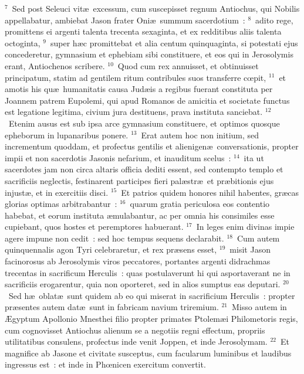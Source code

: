 ${}^{7}$~Sed post Seleuci vit\ae\ excessum, cum suscepisset regnum Antiochus, qui Nobilis appellabatur, ambiebat Jason frater Oni\ae\ summum sacerdotium~:
${}^{8}$~adito rege, promittens ei argenti talenta trecenta sexaginta, et ex redditibus aliis talenta octoginta,
${}^{9}$~super h\ae c promittebat et alia centum quinquaginta, si potestati ejus concederetur, gymnasium et ephebiam sibi constituere, et eos qui in Jerosolymis erant, Antiochenos scribere.
${}^{10}$~Quod cum rex annuisset, et obtinuisset principatum, statim ad gentilem ritum contribules suos transferre cœpit,
${}^{11}$~et amotis his qu\ae\ humanitatis causa Jud\ae is a regibus fuerant constituta per Joannem patrem Eupolemi, qui apud Romanos de amicitia et societate functus est legatione legitima, civium jura destituens, prava instituta sanciebat.
${}^{12}$~Etenim ausus est sub ipsa arce gymnasium constituere, et optimos quosque epheborum in lupanaribus ponere.
${}^{13}$~Erat autem hoc non initium, sed incrementum quoddam, et profectus gentilis et alienigen\ae\ conversationis, propter impii et non sacerdotis Jasonis nefarium, et inauditum scelus~:
${}^{14}$~ita ut sacerdotes jam non circa altaris officia dediti essent, sed contempto templo et sacrificiis neglectis, festinarent participes fieri pal\ae str\ae\ et pr\ae bitionis ejus injust\ae , et in exercitiis disci.
${}^{15}$~Et patrios quidem honores nihil habentes, gr\ae cas glorias optimas arbitrabantur~:
${}^{16}$~quarum gratia periculosa eos contentio habebat, et eorum instituta \ae mulabantur, ac per omnia his consimiles esse cupiebant, quos hostes et peremptores habuerant.
${}^{17}$~In leges enim divinas impie agere impune non cedit~: sed hoc tempus sequens declarabit.
${}^{18}$~Cum autem quinquennalis agon Tyri celebraretur, et rex pr\ae sens esset,
${}^{19}$~misit Jason facinorosus ab Jerosolymis viros peccatores, portantes argenti didrachmas trecentas in sacrificum Herculis~: quas postulaverunt hi qui asportaverant ne in sacrificiis erogarentur, quia non oporteret, sed in alios sumptus eas deputari.
${}^{20}$~Sed h\ae\ oblat\ae\ sunt quidem ab eo qui miserat in sacrificium Herculis~: propter pr\ae sentes autem dat\ae\ sunt in fabricam navium triremium.
${}^{21}$~Misso autem in \AE gyptum Apollonio Mnesthei filio propter primates Ptolem\ae i Philometoris regis, cum cognovisset Antiochus alienum se a negotiis regni effectum, propriis utilitatibus consulens, profectus inde venit Joppen, et inde Jerosolymam.
${}^{22}$~Et magnifice ab Jasone et civitate susceptus, cum facularum luminibus et laudibus ingressus est~: et inde in Phœnicen exercitum convertit.


